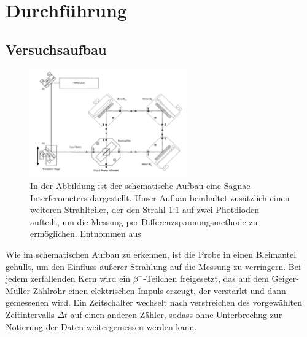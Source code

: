 \newpage
\section{Durchführung}
    \subsection{Versuchsaufbau}

        \FloatBarrier

        \begin{figure}[h]
          \centering
          \includegraphics[width = 0.6\textwidth]{pictures/Sagnac.png}
          \caption{In der Abbildung ist der schematische Aufbau eine Sagnac-Interferometers dargestellt. Unser Aufbau beinhaltet zusätzlich einen weiteren Strahlteiler, der den Strahl 1:1 auf zwei Photdioden aufteilt, um die Messung per Differenzspannungsmethode zu ermöglichen. Entnommen aus \cite{tu_dortmund_versuchsanleitung_2021-3}}
          \label{fig:Aufbau}
        \end{figure}

        \FloatBarrier

        \noindent
        Wie im schematischen Aufbau zu erkennen, ist die Probe in einen Bleimantel gehüllt, um den Einfluss äußerer Strahlung auf die Messung zu verringern. Bei jedem zerfallenden Kern wird ein
        $\beta^-$-Teilchen freigesetzt, das auf dem Geiger-Müller-Zählrohr einen elektrischen Impuls erzeugt, der verstärkt und dann gemessenen wird. Ein Zeitschalter wechselt nach verstreichen
        des vorgewählten Zeitintervalls $\Delta t$ auf einen anderen Zähler, sodass ohne Unterbrechng zur Notierung der Daten weitergemessen werden kann.

